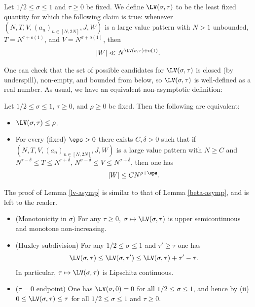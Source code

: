 \begin{definition}\label{lv-def}
\leanok
Let $1/2 \leq \sigma \leq 1$ and $\tau \geq 0$ be fixed. We define $\LV(\sigma,\tau)$ to be the least fixed quantity for which the following claim is true: whenever $(N,T,V,(a_n)_{n \in [N,2N]},J,W)$ is a large value pattern with $N>1$ unbounded, $T = N^{\tau+o(1)}$, and $V = N^{\sigma+o(1)}$, then
$$ |W| \ll N^{\LV(\sigma,\tau)+o(1)}.$$
\end{definition}


One can check that the set of possible candidates for $\LV(\sigma,\tau)$ is closed (by underspill), non-empty, and bounded from below, so $\LV(\sigma,\tau)$ is well-defined as a real number.  As usual, we have an equivalent non-asymptotic definition:

\begin{lemma}\label{lv-asymp} Let $1/2 \leq \sigma \leq 1$, $\tau \geq 0$, and $\rho \geq 0$ be fixed.  Then the following are equivalent:
    \begin{itemize}
    \item[(i)] $\LV(\sigma,\tau) \leq \rho$.
    \item[(ii)] For every (fixed)  $\eps>0$ there exists $C, \delta>0$ such that if $(N,T,V,(a_n)_{n \in [N,2N]},J,W)$ is a large value pattern with $N \geq C$ and $N^{\tau-\delta} \leq T \leq N^{\tau+\delta}$, $N^{\sigma-\delta} \leq V \leq N^{\sigma+\delta}$, then one has
    $$ |W| \leq C N^{\rho+\eps}.$$
    \end{itemize}
\end{lemma}

The proof of Lemma \ref{lv-asymp} is similar to that of Lemma \ref{beta-asymp}, and is left to the reader.


\begin{lemma}\label{lv-basic}
    \begin{itemize}
        \item[(i)] (Monotonicity in $\sigma$) For any $\tau \geq 0$, $\sigma \mapsto \LV(\sigma,\tau)$ is upper semicontinuous and monotone non-increasing.
        \item[(ii)] (Huxley subdivision) For any $1/2 \leq \sigma \leq 1$ and $\tau' \geq \tau$ one has
$$ \LV(\sigma,\tau) \leq \LV(\sigma,\tau') \leq \LV(\sigma,\tau) + \tau'-\tau.$$
In particular, $\tau \mapsto \LV(\sigma,\tau)$ is Lipschitz continuous.
        \item[(iii)]  ($\tau=0$ endpoint) One has $\LV(\sigma,0)=0$ for all $1/2 \leq \sigma \leq 1$, and hence by (ii) $0 \leq \LV(\sigma,\tau) \leq \tau$ for all $1/2 \leq \sigma \leq 1$ and $\tau \geq 0$.
    \end{itemize}
\end{lemma}

